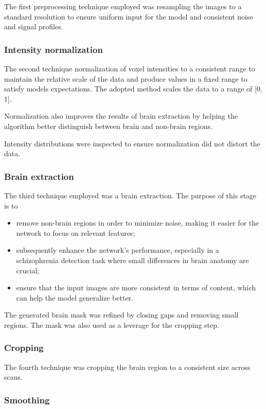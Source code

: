 The first preprocessing technique employed was resampling the images to a standard resolution to ensure uniform input for the model and consistent noise and signal profiles.

\subsubsection{Intensity normalization}

The second technique normalization of voxel intensities to a consistent range to maintain the relative scale of the data and produce values in a fixed range to satisfy models expectations. The adopted method scales the data to a range of [0, 1].

Normalization also improves the results of brain extraction by helping the algorithm better distinguish between brain and non-brain regions.

Intensity distributions were inspected to ensure normalization did not distort the data.

\subsubsection{Brain extraction}

The third technique employed was a brain extraction. The purpose of this stage is to
\begin{itemize}
    \item remove non-brain regions in order to minimize noise, making it easier for the network to focus on relevant features;
    \item subsequently enhance the network's performance, especially in a schizophrenia detection task where small differences in brain anatomy are crucial;
    \item ensure that the input images are more consistent in terms of content, which can help the model generalize better.
\end{itemize}

The generated brain mask was refined by closing gaps and removing small regions. The mask was also used as a leverage for the cropping step.

\subsubsection{Cropping}

The fourth technique was cropping the brain region to a consistent size across scans.

\subsubsection{Smoothing}

